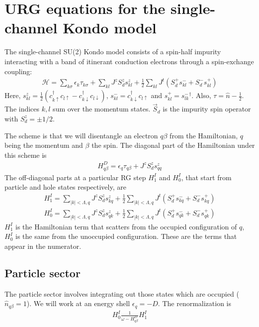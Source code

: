 \documentclass[12pt]{revtex4-2}
\begin{document}
\clearpage
\appendix
\section{URG equations for the single-channel Kondo model}
The single-channel SU(2) Kondo model consists of a spin-half impurity interacting with a band of itinerant conduction electrons through a spin-exchange coupling:
\begin{align}
\label{1KondoURG}
	\mathcal{H} = \sum_{k\sigma}\epsilon_{k}\tau_{k\sigma} + \sum_{kl} J^z S_d^z s^z_{kl} + \frac{1}{2}\sum_{kl} J^t \left(S_d^+ s^-_{kl}  + S_d^- s^+_{kl}\right)
\end{align}
Here, \(s^z_{kl} = \frac{1}{2}\left(c^\dagger_{k\uparrow}c_{l \uparrow} - c^\dagger_{k\downarrow}c_{l \downarrow}\right)\), \(s^-_{kl} = c^\dagger_{k \downarrow}c_{l \uparrow}\) and \(s^+_{kl} = {s^-_{lk}}^\dagger\). Also, \(\tau = \hat n - \frac{1}{2}\). The indices \(k,l\) sum over the momentum states. \(\vec S_d\) is the impurity spin operator with \(S_d^z = \pm 1/2\).

The scheme is that we will disentangle an electron \(q\beta\) from the Hamiltonian, \(q\) being the momentum and \(\beta\) the spin. The diagonal part of the Hamiltonian under this scheme is
\begin{align}
\label{kondodiag}
H^D_{q\beta} = \epsilon_q \tau_{q\beta} + J^z S_d^z s_{qq}^z
\end{align}
The off-diagonal parts at a particular RG step \(H^I_1\) and \(H^I_0\), that start from particle and hole states respectively, are
\begin{align}
	H^I_1 = \sum_{|k|<\Lambda,q} J^z S_d^z s^z_{kq} + \frac{1}{2}\sum_{|k|<\Lambda,q} J^t \left(S_d^+ s^-_{kq} + S_d^- s^+_{kq}\right)\\
	H^I_0 = \sum_{|k|<\Lambda,q} J^z S_d^z s^z_{qk} + \frac{1}{2}\sum_{|k|<\Lambda,q} J^t \left(S_d^+ s^-_{qk}  + S_d^- s^+_{qk}\right)
\end{align}
\(H^I_1\) is the Hamiltonian term that scatters from the occupied configuration of \(q\), \(H^I_0\) is the same from the unoccupied configuration.
These are the terms that appear in the numerator.
\subsection{Particle sector}
The particle sector involves integrating out those states which are occupied (\(\hat n_{q\beta}=1\)). We will work at an energy  shell \(\epsilon_q = -D\). The renormalization is
\begin{align}
	H^I_0 \frac{1}{\omega - H^D_{q\beta}} H^I_1
\end{align}
\end{document}
